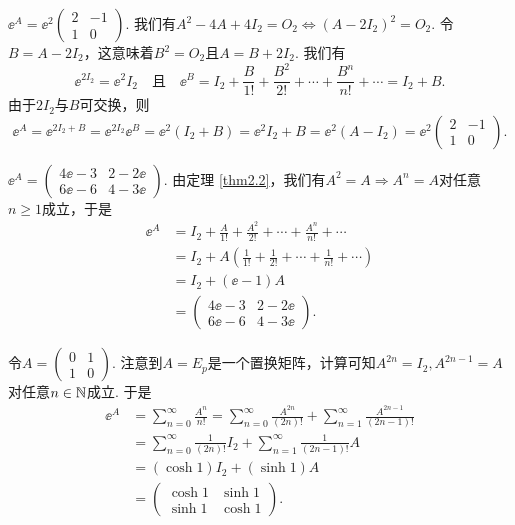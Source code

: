 \begin{solution}
  \begin{inparaenum}[(a)]
    \item $\ee^A=\ee^2\begin{pmatrix}
      2 & -1 \\
      1 & 0
    \end{pmatrix}$. 我们有$A^2-4A+4I_2=O_2\Leftrightarrow (A-2I_2)^2=O_2$. 令$B=A-2I_2$，这意味着$B^2=O_2$且$A=B+2I_2$. 我们有
    \[
      \ee^{2I_2} = \ee^2I_2\quad \text{且} \quad
      \ee^B = I_2 + \frac B{1!} + \frac{B^2}{2!} + \cdots + \frac{B^n}{n!} + \cdots = I_2 + B.
    \]
    由于$2I_2$与$B$可交换，则
    \[
      \ee^A = \ee^{2I_2+B} = \ee^{2I_2}\ee^B = \ee^2(I_2 + B) = \ee^2{I_2 + B} = \ee^2(A - I_2) = \ee^2\begin{pmatrix}
        2 & -1 \\
        1 & 0
      \end{pmatrix}.
    \]

    \item $\ee^A=\begin{pmatrix}
      4\ee-3 & 2-2\ee \\
      6\ee-6 & 4-3\ee
    \end{pmatrix}$. 由定理 \ref{thm2.2}，我们有$A^2=A\Rightarrow A^n=A$对任意$n\ge1$成立，于是
    \begin{align*}
      \ee^A & = I_2 + \frac A{1!} + \frac {A^2}{2!} + \cdots + \frac {A^n}{n!} + \cdots \\
      & = I_2 + A \left( \frac1{1!} + \frac1{2!} + \cdots + \frac1{n!} + \cdots  \right)\\
      & = I_2 + (\ee-1)A \\
      & = \begin{pmatrix}
      4\ee-3 & 2-2\ee \\
      6\ee-6 & 4-3\ee
    \end{pmatrix}.
    \end{align*}
  \end{inparaenum}
\end{solution}

\begin{solution}
  令$A=\begin{pmatrix}
    0 & 1 \\
    1 & 0
  \end{pmatrix}$. 注意到$A=E_p$是一个置换矩阵，计算可知$A^{2n}=I_2,A^{2n-1}=A$对任意$n\in\mathbb N$成立. 于是
  \begin{align*}
    \ee^A & = \sum_{n=0}^\infty \frac{A^n}{n!} = \sum_{n=0}^\infty \frac{A^{2n}}{(2n)!} + \sum_{n=1}^\infty \frac{A^{2n-1}}{(2n-1)!} \\
    & = \sum_{n=0}^\infty\frac1{(2n)!}I_2 + \sum_{n=1}^\infty \frac1{(2n-1)!}A \\
    & = (\cosh1)I_2 + (\sinh1)A \\
    & = \begin{pmatrix}
      \cosh 1 & \sinh 1\\
      \sinh 1 & \cosh 1
    \end{pmatrix}.
  \end{align*}
\end{solution}

